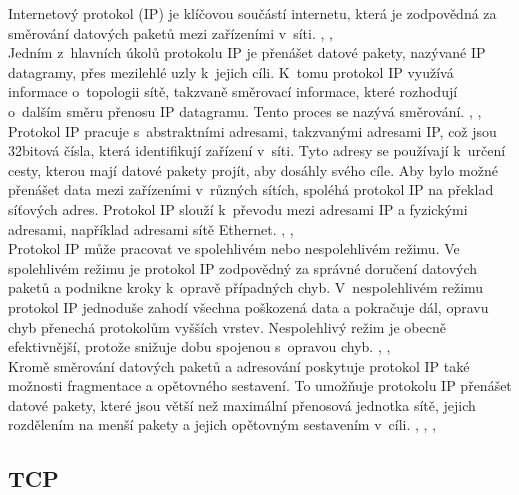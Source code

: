 \documentclass[12pt]{report}			%
\begin{document}
				
Internetový protokol (IP) je klíčovou součástí internetu, která je zodpovědná za směrování datových paketů mezi zařízeními v~síti. \cite{IP2}, \cite{IP3}, \cite{IP4}
\\
Jedním z~hlavních úkolů protokolu IP je přenášet datové pakety, nazývané IP datagramy, přes mezilehlé uzly k~jejich cíli. K~tomu protokol IP využívá informace o~topologii sítě, takzvaně směrovací informace, které rozhodují o~dalším směru přenosu IP datagramu. Tento proces se nazývá směrování. \cite{IP2}, \cite{IP3}, \cite{IP4}
\\
Protokol IP pracuje s~abstraktními adresami, takzvanými adresami IP, což jsou 32bitová čísla, která identifikují zařízení v~síti. Tyto adresy se používají k~určení cesty, kterou mají datové pakety projít, aby dosáhly svého cíle. Aby bylo možné přenášet data mezi zařízeními v~různých sítích, spoléhá protokol IP na překlad síťových adres. Protokol IP slouží k~převodu mezi adresami IP a fyzickými adresami, například adresami sítě Ethernet. \cite{IP2}, \cite{IP3}, \cite{IP4}
\\
Protokol IP může pracovat ve spolehlivém nebo nespolehlivém režimu. Ve spolehlivém režimu je protokol IP zodpovědný za správné doručení datových paketů a podnikne kroky k~opravě případných chyb. V~nespolehlivém režimu protokol IP jednoduše zahodí všechna poškozená data a pokračuje dál, opravu chyb přenechá protokolům vyšších vrstev. Nespolehlivý režim je obecně efektivnější, protože snižuje dobu spojenou s~opravou chyb. \cite{IP2}, \cite{IP3}, \cite{IP4}
\\
Kromě směrování datových paketů a adresování poskytuje protokol IP také možnosti fragmentace a opětovného sestavení. To umožňuje protokolu IP přenášet datové pakety, které jsou větší než maximální přenosová jednotka sítě, jejich rozdělením na menší pakety a jejich opětovným sestavením v~cíli. \cite{IP1}, \cite{IP2}, \cite{IP3}, \cite{IP4}


				\subsection{TCP}
				
\end{document}

